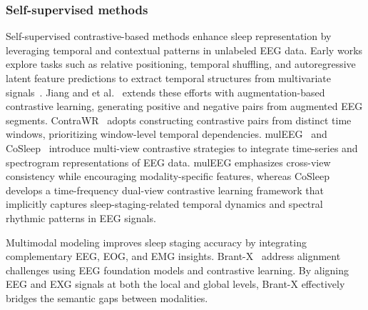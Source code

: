 \subsubsection{Self-supervised methods}
Self-supervised contrastive-based methods enhance sleep representation by leveraging temporal and contextual patterns in unlabeled EEG data.
Early works explore tasks such as relative positioning, temporal shuffling, and autoregressive latent feature predictions to extract temporal structures from multivariate signals~\cite{banville2019self, oord2018representation}. 
Jiang and et al.~\cite{jiang2021self} extends these efforts with augmentation-based contrastive learning, generating positive and negative pairs from augmented EEG segments.
ContraWR~\cite{yang2023self} adopts constructing contrastive pairs from distinct time windows, prioritizing window-level temporal dependencies.
mulEEG~\cite{kumar2022muleeg} and CoSleep~\cite{ye2021cosleep} introduce multi-view contrastive strategies to integrate time-series and spectrogram representations of EEG data. 
mulEEG emphasizes cross-view consistency while encouraging modality-specific features, whereas CoSleep develops a time-frequency dual-view contrastive learning framework that implicitly captures sleep-staging-related temporal dynamics and spectral rhythmic patterns in EEG signals.

Multimodal modeling improves sleep staging accuracy by integrating complementary EEG, EOG, and EMG insights. Brant-X~\cite{zhang2024brantx} address alignment challenges using EEG foundation models and contrastive learning. By aligning EEG and EXG signals at both the local and global levels, Brant-X effectively bridges the semantic gaps between modalities.






